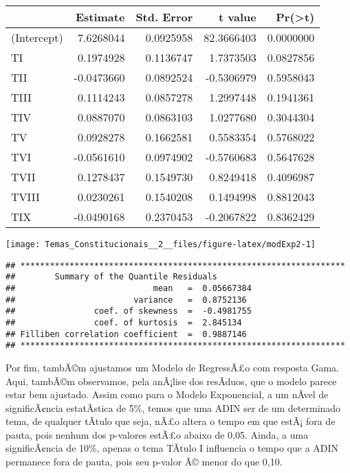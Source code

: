 \documentclass[]{article}
\begin{document}
\begin{longtable}[]{@{}lrrrr@{}}
\toprule
& Estimate & Std. Error & t value &
Pr(\textgreater{}\textbar{}t\textbar{})\tabularnewline
\midrule
\endhead
(Intercept) & 7.6268044 & 0.0925958 & 82.3666403 &
0.0000000\tabularnewline
TI & 0.1974928 & 0.1136747 & 1.7373503 & 0.0827856\tabularnewline
TII & -0.0473660 & 0.0892524 & -0.5306979 & 0.5958043\tabularnewline
TIII & 0.1114243 & 0.0857278 & 1.2997448 & 0.1941361\tabularnewline
TIV & 0.0887070 & 0.0863103 & 1.0277680 & 0.3044304\tabularnewline
TV & 0.0928278 & 0.1662581 & 0.5583354 & 0.5768022\tabularnewline
TVI & -0.0561610 & 0.0974902 & -0.5760683 & 0.5647628\tabularnewline
TVII & 0.1278437 & 0.1549730 & 0.8249418 & 0.4096987\tabularnewline
TVIII & 0.0230261 & 0.1540208 & 0.1494998 & 0.8812043\tabularnewline
TIX & -0.0490168 & 0.2370453 & -0.2067822 & 0.8362429\tabularnewline
\bottomrule
\end{longtable}

\begin{center}\texttt{[image: Temas\_Constitucionais\_\_2\_\_files/figure-latex/modExp2-1]} \end{center}

\begin{verbatim}
## ******************************************************************
##        Summary of the Quantile Residuals
##                            mean   =  0.05667384 
##                        variance   =  0.8752136 
##                coef. of skewness  =  -0.4981755 
##                coef. of kurtosis  =  2.845134 
## Filliben correlation coefficient  =  0.9887146 
## ******************************************************************
\end{verbatim}

Por fim, tambÃ©m ajustamos um Modelo de RegressÃ£o com resposta Gama.
Aqui, tambÃ©m observamos, pela anÃ¡lise dos resÃ­duos, que o modelo
parece estar bem ajustado. Assim como para o Modelo Exponencial, a um
nÃ­vel de significÃ¢ncia estatÃ­stica de 5\%, temos que uma ADIN ser de
um determinado tema, de qualquer tÃ­tulo que seja, nÃ£o altera o tempo
em que estÃ¡ fora de pauta, pois nenhum dos p-valores estÃ£o abaixo de
0,05. Ainda, a uma significÃ¢ncia de 10\%, apenas o tema TÃ­tulo I
influencia o tempo que a ADIN permanece fora de pauta, pois seu p-valor
Ã© menor do que 0,10.
\end{document}
